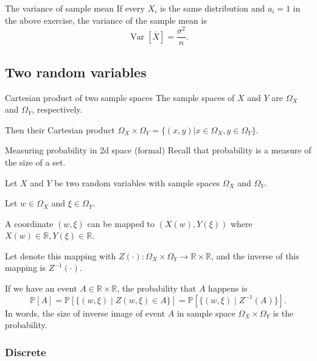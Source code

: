 \documentclass[11pt,a4paper,fleqn]{article}
\numberwithin{equation}{section}
\newcommand{\prob}{\mathbb{P}}
\newcommand{\samplespace}{\Omega}
\DeclareMathOperator\Var{\mathrm{Var}}
\newcommand{\mean}[1]{\bar{#1}}
\begin{document}
\begin{fact}{The variance of sample mean}{}
    If every $X_i$ is the same distribution and $a_i=1$ in the above exercise, the variance of the sample mean is
    \begin{equation*}
        \Var[\mean{X}]=\frac{\sigma^2}{n}.
    \end{equation*}
\end{fact}

\subsection{Two random variables}

\begin{fact}{Cartesian product of two sample spaces}{}
    The sample spaces of $X$ and $Y$ are $\samplespace_X$ and $\samplespace_Y$, respectively.

    Then their Cartesian product $\samplespace_X\times\samplespace_Y = \{(x,y)|x\in\samplespace_X, y\in\samplespace_Y\}$.
\end{fact}

\begin{fact}{Measuring probability in 2d space (formal)}{}
    Recall that probability is a measure of the size of a set.

    Let $X$ and $Y$ be two random variables with sample spaces $\samplespace_X$ and $\samplespace_Y$.

    Let $w\in\samplespace_X$ and $\xi\in\samplespace_Y$.

    A coordinate $(w,\xi)$ can be mapped to $(X(w),Y(\xi))$ where $X(w)\in\mathbb{R},Y(\xi)\in\mathbb{R}$.

    Let denote this mapping with $Z(\cdot): \samplespace_X\times\samplespace_Y\rightarrow\mathbb{R}\times\mathbb{R}$, and the inverse of this mapping is $Z^{-1}(\cdot)$.

    If we have an event $A\in\mathbb{R}\times\mathbb{R}$, the probability that $A$ happens is
    \begin{equation*}
        \prob[A]=\prob[\{(w,\xi) \mid Z(w,\xi)\in A\}] = \prob[\{(w,\xi) \mid Z^{-1}(A)\} ].
    \end{equation*}
    In words, the size of inverse image of event $A$ in sample space $\samplespace_X\times\samplespace_Y$ is the probability.
\end{fact}

\subsubsection{Discrete}
\end{document}

